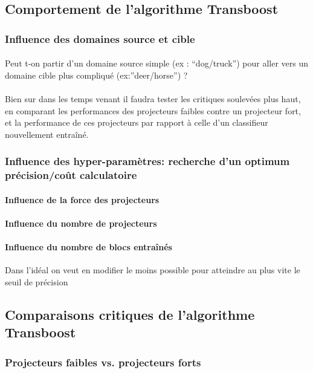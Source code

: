 \documentclass[11 pt]{article}
\begin{document}
\subsection{Comportement de l'algorithme Transboost}
\subsubsection{Influence des domaines source et cible}
\paragraph{}Peut t-on partir d’un domaine source simple (ex : “dog/truck”) pour aller vers un domaine cible plus compliqué (ex:”deer/horse”) ?

\paragraph{}Bien sur dans les temps venant il faudra tester les critiques soulevées plus haut, en comparant les performances des projecteurs faibles contre un projecteur fort, et la performance de ces projecteurs par rapport à celle d'un classifieur nouvellement entraîné.


\subsubsection{Influence des hyper-paramètres: recherche d'un optimum précision/coût calculatoire}
\paragraph{Influence de la force des projecteurs}
\paragraph{Influence du nombre de projecteurs}
\paragraph{Influence du nombre de blocs entraînés}
Dans l’idéal on veut en modifier le moins possible pour atteindre au plus vite le seuil de précision

\subsection{Comparaisons critiques de l'algorithme Transboost}
\subsubsection{Projecteurs faibles vs. projecteurs forts}
\end{document}
